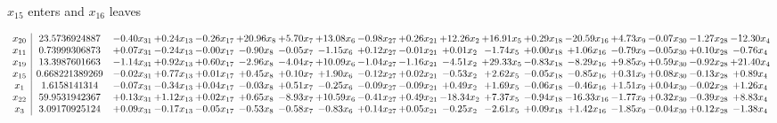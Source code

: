 \documentclass[9pt]{article}
\begin{document}
 $ x_{15} $ enters and $ x_{16} $ leaves 

 \[\begin{array}{c| c c@{\hskip 2pt} c@{\hskip 2pt} c@{\hskip 2pt} c@{\hskip 2pt} c@{\hskip 2pt} c@{\hskip 2pt} c@{\hskip 2pt} c@{\hskip 2pt} c@{\hskip 2pt} c@{\hskip 2pt} c@{\hskip 2pt} c@{\hskip 2pt} c@{\hskip 2pt} c@{\hskip 2pt} c@{\hskip 2pt} c@{\hskip 2pt} }
 x_{20}   &  23.5736924887 & -0.40 x_{31} & +  0.24 x_{13} & -0.26 x_{17} & + 20.96 x_{8} & +  5.70 x_{7} & + 13.08 x_{6} & -0.98 x_{27} & +  0.26 x_{21} & + 12.26 x_{2} & + 16.91 x_{5} & +  0.29 x_{18} & -20.59 x_{16} & +  4.73 x_{9} & -0.07 x_{30} & -1.27 x_{28} & -12.30 x_{4}\\
 x_{11}   &  0.73999306873 & +  0.07 x_{31} & -0.24 x_{13} & -0.00 x_{17} & -0.90 x_{8} & -0.05 x_{7} & -1.15 x_{6} & +  0.12 x_{27} & -0.01 x_{21} & +  0.01 x_{2} & -1.74 x_{5} & +  0.00 x_{18} & +  1.06 x_{16} & -0.79 x_{9} & -0.05 x_{30} & +  0.10 x_{28} & -0.76 x_{4}\\
 x_{19}   &  13.3987601663 & -1.14 x_{31} & +  0.92 x_{13} & +  0.60 x_{17} & -2.96 x_{8} & -4.04 x_{7} & + 10.09 x_{6} & -1.04 x_{27} & -1.16 x_{21} & -4.51 x_{2} & + 29.33 x_{5} & -0.83 x_{18} & -8.29 x_{16} & +  9.85 x_{9} & +  0.59 x_{30} & -0.92 x_{28} & + 21.40 x_{4}\\
 x_{15}   &  0.668221389269 & -0.02 x_{31} & +  0.77 x_{13} & +  0.01 x_{17} & +  0.45 x_{8} & +  0.10 x_{7} & +  1.90 x_{6} & -0.12 x_{27} & +  0.02 x_{21} & -0.53 x_{2} & +  2.62 x_{5} & -0.05 x_{18} & -0.85 x_{16} & +  0.31 x_{9} & +  0.08 x_{30} & -0.13 x_{28} & +  0.89 x_{4}\\
 x_{1}   &  1.6158141314 & -0.07 x_{31} & -0.34 x_{13} & +  0.04 x_{17} & -0.03 x_{8} & +  0.51 x_{7} & -0.25 x_{6} & -0.09 x_{27} & -0.09 x_{21} & +  0.49 x_{2} & +  1.69 x_{5} & -0.06 x_{18} & -0.46 x_{16} & +  1.51 x_{9} & +  0.04 x_{30} & -0.02 x_{28} & +  1.26 x_{4}\\
 x_{22}   &  59.9531942367 & +  0.13 x_{31} & +  1.12 x_{13} & +  0.02 x_{17} & +  0.65 x_{8} & -8.93 x_{7} & + 10.59 x_{6} & -0.41 x_{27} & +  0.49 x_{21} & -18.34 x_{2} & +  7.37 x_{5} & -0.94 x_{18} & -16.33 x_{16} & -1.77 x_{9} & +  0.32 x_{30} & -0.39 x_{28} & +  8.83 x_{4}\\
 x_{3}   &  3.09170925124 & +  0.09 x_{31} & -0.17 x_{13} & -0.05 x_{17} & -0.53 x_{8} & -0.58 x_{7} & -0.83 x_{6} & +  0.14 x_{27} & +  0.05 x_{21} & -0.25 x_{2} & -2.61 x_{5} & +  0.09 x_{18} & +  1.42 x_{16} & -1.85 x_{9} & -0.04 x_{30} & +  0.12 x_{28} & -1.38 x_{4}\\

\end{array}\]
\end{document}
